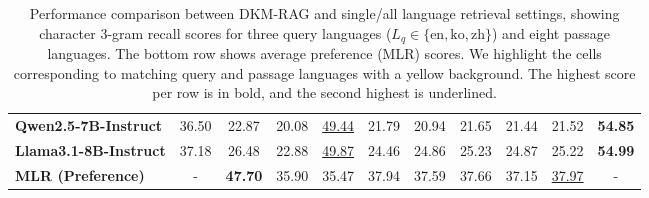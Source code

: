 \begin{table*}[t]
\begin{tabular}{lcccccccccc}
\textbf{Qwen2.5-7B-Instruct}  & 36.50 & 22.87 & 20.08 & \cellcolor{yellow}\underline{49.44} & 21.79 & 20.94 & 21.65 & 21.44 & 21.52 & \textbf{54.85} \\
\textbf{Llama3.1-8B-Instruct} & 37.18 & 26.48 & 22.88 & \cellcolor{yellow}\underline{49.87} & 24.46 & 24.86 & 25.23 & 24.87 & 25.22 & \textbf{54.99} \\
\midrule
\textbf{MLR (Preference)}     & - & \textbf{47.70} & 35.90 & 35.47 & 37.94 & 37.59 & 37.66 & 37.15 & \underline{37.97} & - \\
\bottomrule
\end{tabular}
\caption{Performance comparison between DKM-RAG and single/all language retrieval settings, showing character 3-gram recall scores for three query languages ($L_q \in \{\text{en}, \text{ko}, \text{zh}\}$) and eight passage languages. The bottom row shows average preference (MLR) scores. We highlight the cells corresponding to matching query and passage languages with a yellow background. The highest score per row is in bold, and the second highest is underlined.}
\label{tab:resource_comparison_updated}
\end{table*}

